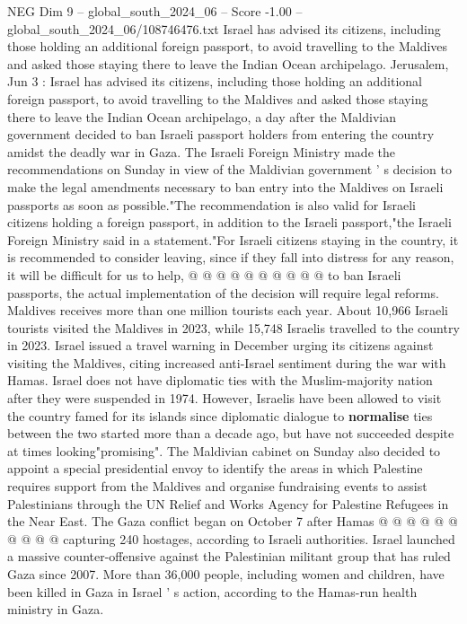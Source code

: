\begin{textsample}{NEG Dim 9 – global\_south\_2024\_06 – Score -1.00 – global\_south\_2024\_06/108746476.txt}  \label{ex:f9_neg_404}
Israel has advised its citizens, including those holding an additional foreign passport, to avoid travelling to the Maldives and asked those staying there to leave the Indian Ocean archipelago.
Jerusalem, Jun 3 : Israel has advised its citizens, including those holding an additional foreign passport, to avoid travelling to the Maldives and asked those staying there to leave the Indian Ocean archipelago, a day after the Maldivian government decided to ban Israeli passport holders from entering the country amidst the deadly war in Gaza.
The Israeli Foreign Ministry made the recommendations on Sunday in view of the Maldivian government ' s decision to make the legal amendments necessary to ban entry into the Maldives on Israeli passports as soon as possible."The recommendation is also valid for Israeli citizens holding a foreign passport, in addition to the Israeli passport,"the Israeli Foreign Ministry said in a statement."For Israeli citizens staying in the country, it is recommended to consider leaving, since if they fall into distress for any reason, it will be difficult for us to help, @ @ @ @ @ @ @ @ @ @ to ban Israeli passports, the actual implementation of the decision will require legal reforms.
Maldives receives more than one million tourists each year.
About 10,966 Israeli tourists visited the Maldives in 2023, while 15,748 Israelis travelled to the country in 2023.
Israel issued a travel warning in December urging its citizens against visiting the Maldives, citing increased anti-Israel sentiment during the war with Hamas.
Israel does not have diplomatic ties with the Muslim-majority nation after they were suspended in 1974.
However, Israelis have been allowed to visit the country famed for its islands since diplomatic dialogue to \textbf{normalise} ties between the two started more than a decade ago, but have not succeeded despite at times looking"promising".
The Maldivian cabinet on Sunday also decided to appoint a special presidential envoy to identify the areas in which Palestine requires support from the Maldives and organise fundraising events to assist Palestinians through the UN Relief and Works Agency for Palestine Refugees in the Near East.
The Gaza conflict began on October 7 after Hamas @ @ @ @ @ @ @ @ @ @ capturing 240 hostages, according to Israeli authorities.
Israel launched a massive counter-offensive against the Palestinian militant group that has ruled Gaza since 2007.
More than 36,000 people, including women and children, have been killed in Gaza in Israel ' s action, according to the Hamas-run health ministry in Gaza.

\end{textsample}
